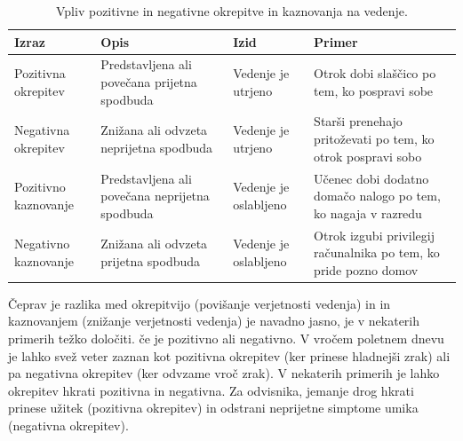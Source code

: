 \documentclass[a4paper, oneside, 12pt]{report}
\begin{document}
\begin{table}[htbp]
\begin{tabulary}{\textwidth}{| L | L | L | L |}
\hline
\textbf{Izraz} & \textbf{Opis} & \textbf{Izid} & \textbf{Primer} \\ \hline
Pozitivna okrepitev & Predstavljena ali povečana prijetna spodbuda & Vedenje je utrjeno & Otrok dobi slaščico po tem, ko pospravi sobe \\ \hline
Negativna okrepitev & Znižana ali odvzeta neprijetna spodbuda & Vedenje je utrjeno & Starši prenehajo pritoževati po tem, ko otrok pospravi sobo \\ \hline
Pozitivno kaznovanje & Predstavljena ali povečana neprijetna spodbuda & Vedenje je oslabljeno & Učenec dobi dodatno domačo nalogo po tem, ko nagaja v razredu \\ \hline
Negativno kaznovanje & Znižana ali odvzeta prijetna spodbuda & Vedenje je oslabljeno & Otrok izgubi privilegij računalnika po tem, ko pride pozno domov \\ \hline
\end{tabulary}
\caption{Vpliv pozitivne in negativne okrepitve in kaznovanja na vedenje.}
\label{table:OperantConditioningTerms}
\end{table}

Čeprav je razlika med okrepitvijo (povišanje verjetnosti vedenja) in in kaznovanjem (znižanje verjetnosti vedenja) je navadno jasno, je v nekaterih primerih težko določiti. če je pozitivno ali negativno. V vročem poletnem dnevu je lahko svež veter zaznan kot pozitivna okrepitev (ker prinese hladnejši zrak) ali pa negativna okrepitev (ker odvzame vroč zrak). V nekaterih primerih je lahko okrepitev hkrati pozitivna in negativna. Za odvisnika, jemanje drog hkrati prinese užitek (pozitivna okrepitev) in odstrani neprijetne simptome umika (negativna okrepitev).~\cite{IntroductionToPsychology}
\end{document}
